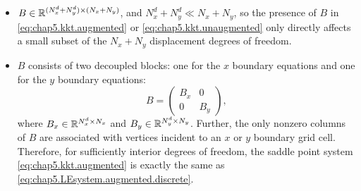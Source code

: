 \begin{itemize}

\item $B \in \mathbb{R}^{(N^d_x + N^d_y) \times (N_x + N_y)}$, and $N^d_x + N^d_y \ll N_x + N_y$, so the presence of $B$ in \eqref{eq:chap5.kkt.augmented} or \eqref{eq:chap5.kkt.unaugmented} only directly affects a small subset of the $N_x + N_y$ displacement degrees of freedom.

\item $B$ consists of two decoupled blocks: one for the $x$ boundary equations and one for the $y$ boundary equations:
\begin{equation} \label{eq:chap5.BxBy}
B = \begin{pmatrix} B_x & 0 \\ 0 & B_y \end{pmatrix},
\end{equation}
where $B_x \in \mathbb{R}^{N^d_x \times N_x}$ and $B_y \in \mathbb{R}^{N^d_y \times N_y}$. Further, the only nonzero columns of $B$ are associated with vertices incident to an $x$ or $y$ boundary grid cell. Therefore, for sufficiently interior degrees of freedom, the saddle point system \eqref{eq:chap5.kkt.augmented} is exactly the same as \eqref{eq:chap5.LEsystem.augmented.discrete}.

\end{itemize}

